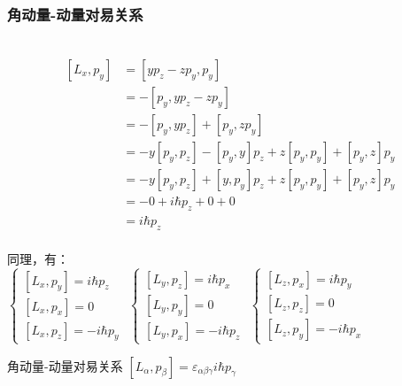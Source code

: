 \begin{frame}
    \frametitle{角动量-动量对易关系}
    \证~ 
    \begin{equation*}
        \begin{split}
        [L_x,p_y]&= [yp_z-zp_y,p_y]\\
        &=-[p_y,yp_z-zp_y]\\
        &=-[p_y,yp_z] + [p_y,zp_y]\\
        &=-y[p_y,p_z] -[p_y,y]p_z + z[p_y,p_y] + [p_y,z]p_y\\
        &=-y[p_y,p_z] +[y,p_y]p_z + z[p_y,p_y] + [p_y,z]p_y\\
        &=-0 + i\hbar p_z + 0+0\\
        &=i\hbar p_z \\
        \end{split}  
    \end{equation*}
\end{frame} 

\begin{frame}   
    同理，有：\\
    $\begin{cases}
        [L_x,p_y]= i\hbar p_z  \\ 
        [L_x,p_x]= 0  \\ 
        [L_x,p_z]= -i\hbar p_y 
    \end{cases}$
    $\begin{cases}
        [L_y,p_z]= i\hbar p_x  \\ 
        [L_y,p_y]= 0  \\ 
        [L_y,p_x]= -i\hbar p_z 
    \end{cases}$
    $\begin{cases}
        [L_z,p_x]= i\hbar p_y  \\ 
        [L_z,p_z]= 0  \\ 
        [L_z,p_y]= -i\hbar p_x 
    \end{cases}$
    \begin{atcbox}{角动量-动量对易关系}
        $ [L_\alpha,p_\beta]= \varepsilon_{\alpha\beta\gamma} i\hbar p_\gamma $
    \end{atcbox}
\end{frame} 

